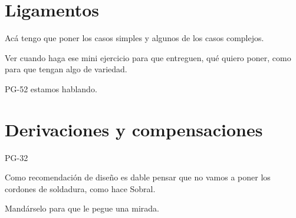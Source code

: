 \newpage
\section{Ligamentos}

Acá tengo que poner los casos simples y algunos de los casos complejos.

Ver cuando haga ese mini ejercicio para que entreguen, qué quiero poner, como para que tengan algo de variedad.



PG-52 estamos hablando.













\newpage
\section{Derivaciones y compensaciones}

PG-32

Como recomendación de diseño es dable pensar que no vamos a poner los cordones de soldadura, como hace Sobral.

Mandárselo para que le pegue una mirada.












